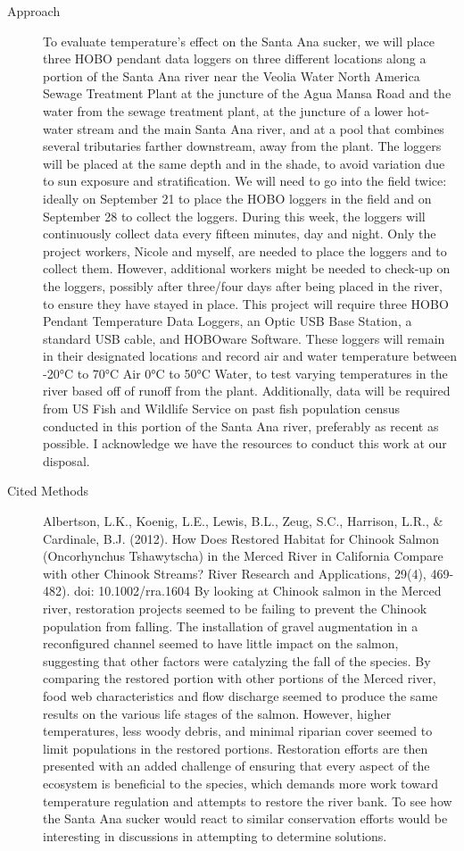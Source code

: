 \documentclass{tufte-handout}
\begin{document}
\begin{description}
  \item[Approach] To evaluate temperature's effect on the Santa Ana sucker, we will place three HOBO pendant data loggers on three different locations along a portion of the Santa Ana river near the Veolia Water North America Sewage Treatment Plant at the juncture of the Agua Mansa Road and the water from the sewage treatment plant, at the juncture of a lower hot-water stream and the main Santa Ana river, and at a pool that combines several tributaries farther downstream, away from the plant. The loggers will be placed at the same depth and in the shade, to avoid variation due to sun exposure and stratification. We will need to go into the field twice: ideally on September 21 to place the HOBO loggers in the field and on September 28 to collect the loggers. During this week, the loggers will continuously collect data every fifteen minutes, day and night. Only the project workers, Nicole and myself, are needed to place the loggers and to collect them. However, additional workers might be needed to check-up on the loggers, possibly after three/four days after being placed in the river, to ensure they have stayed in place. This project will require three HOBO Pendant Temperature Data Loggers, an Optic USB Base Station, a standard USB cable, and HOBOware Software. These loggers will remain in their designated locations and record air and water temperature between -20°C to 70°C Air 0°C to 50°C Water, to test varying temperatures in the river based off of runoff from the plant. Additionally, data will be required from US Fish and Wildlife Service on past fish population census conducted in this portion of the Santa Ana river, preferably as recent as possible. I acknowledge we have the resources to conduct this work at our disposal.
  \item[Cited Methods] Albertson, L.K., Koenig, L.E., Lewis, B.L., Zeug, S.C., Harrison, L.R., & Cardinale, B.J. (2012). How Does Restored Habitat for Chinook Salmon (Oncorhynchus Tshawytscha) in the Merced River in California Compare with other Chinook Streams? River Research and Applications, 29(4), 469-482). doi: 10.1002/rra.1604
By looking at Chinook salmon in the Merced river, restoration projects seemed to be failing to prevent the Chinook population from falling. The installation of gravel augmentation in a reconfigured channel seemed to have little impact on the salmon, suggesting that other factors were catalyzing the fall of the species. By comparing the restored portion with other portions of the Merced river, food web characteristics and flow discharge seemed to produce the same results on the various life stages of the salmon. However, higher temperatures, less woody debris, and minimal riparian cover seemed to limit populations in the restored portions. Restoration efforts are then presented with an added challenge of ensuring that every aspect of the ecosystem is beneficial to the species, which demands more work toward temperature regulation and attempts to restore the river bank. To see how the Santa Ana sucker would react to similar conservation efforts would be interesting in discussions in attempting to determine solutions. 

\end{description}
\end{document}
